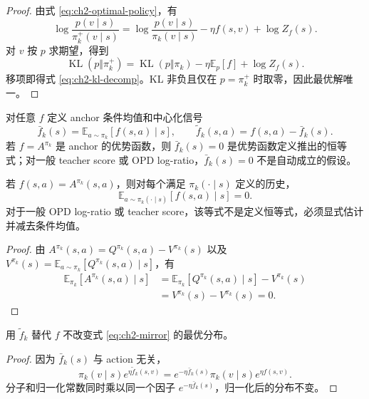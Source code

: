 \begin{proof}
由式 \eqref{eq:ch2-optimal-policy}，有
\[
\log\frac{p(v\mid s)}{\pi_k^+(v\mid s)}
=\log\frac{p(v\mid s)}{\pi_k(v\mid s)}-\eta f(s,v)+\log Z_f(s).
\]
对 $v$ 按 $p$ 求期望，得到
\[
\operatorname{KL}(p\Vert\pi_k^+)
=\operatorname{KL}(p\Vert\pi_k)-\eta\mathbb E_p[f]+\log Z_f(s).
\]
移项即得式 \eqref{eq:ch2-kl-decomp}。KL 非负且仅在 $p=\pi_k^+$ 时取零，因此最优解唯一。
\end{proof}

\begin{definition}
\label{def:ch2-centered-signal}
对任意 $f$ 定义 anchor 条件均值和中心化信号
\[
\bar f_k(s)=\mathbb E_{a\sim\pi_k}[f(s,a)\mid s],
\qquad
\widetilde f_k(s,a)=f(s,a)-\bar f_k(s).
\]
若 $f=A^{\pi_k}$ 是 anchor 的优势函数，则 $\bar f_k(s)=0$ 是优势函数定义推出的恒等式；对一般 teacher score 或 OPD log-ratio，$\bar f_k(s)=0$ 不是自动成立的假设。
\end{definition}

\begin{proposition}
\label{prop:ch2-advantage-centering}
若 $f(s,a)=A^{\pi_k}(s,a)$，则对每个满足 $\pi_k(\cdot\mid s)$ 定义的历史，
\begin{equation}
\label{eq:ch2-advantage-zero-mean}
\mathbb E_{a\sim\pi_k(\cdot\mid s)}[f(s,a)\mid s]=0.
\end{equation}
对于一般 OPD log-ratio 或 teacher score，该等式不是定义恒等式，必须显式估计并减去条件均值。
\end{proposition}

\begin{proof}
由 $A^{\pi_k}(s,a)=Q^{\pi_k}(s,a)-V^{\pi_k}(s)$ 以及
$V^{\pi_k}(s)=\mathbb E_{a\sim\pi_k}[Q^{\pi_k}(s,a)\mid s]$，有
\begin{align*}
\mathbb E_{\pi_k}[A^{\pi_k}(s,a)\mid s]
&=\mathbb E_{\pi_k}[Q^{\pi_k}(s,a)\mid s]-V^{\pi_k}(s)\\
&=V^{\pi_k}(s)-V^{\pi_k}(s)=0.
\end{align*}
\end{proof}

\begin{proposition}
\label{prop:ch2-centering}
用 $\widetilde f_k$ 替代 $f$ 不改变式 \eqref{eq:ch2-mirror} 的最优分布。
\end{proposition}

\begin{proof}
因为 $\bar f_k(s)$ 与 action 无关，
\[
\pi_k(v\mid s)e^{\eta\widetilde f_k(s,v)}
=e^{-\eta\bar f_k(s)}\pi_k(v\mid s)e^{\eta f(s,v)}.
\]
分子和归一化常数同时乘以同一个因子 $e^{-\eta\bar f_k(s)}$，归一化后的分布不变。
\end{proof}

